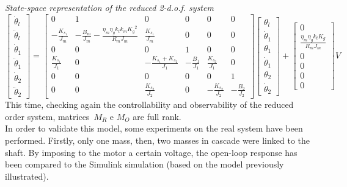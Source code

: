 \textit{State-space representation of the reduced 2-d.o.f. system}
\begin{equation}
	\begin{bmatrix}
		\dot{\theta}_l \\
		\ddot{\theta}_l \\
		\dot{\theta}_1 \\
		\ddot{\theta}_1 \\
		\dot{\theta}_2 \\
		\ddot{\theta}_2
	\end{bmatrix}
	=
	\begin{bmatrix}
		0 &1 & 0 & 0 & 0 & 0 \\
		-\frac{K_{s_1}}{J_m} & -\frac{B_m}{J_m}-\frac{\eta_m \eta_g k_t k_m {K_g}^2}{R_m J_m}  & \frac{K_{s_1}}{J_m} & 0 & 0 & 0 \\
		0 & 0 & 0 & 1 & 0 & 0 \\
		\frac{K_{s_1}}{J_1} & 0 & -\frac{K_{s_1}+K_{s_2}}{J_1} & -\frac{B_1}{J_1} & \frac{K_{s_2}}{J_1} & 0 \\
		0 & 0 & 0 & 0 & 0 & 1 \\
		0 & 0 & \frac{K_{s_2}}{J_2} & 0 & -\frac{K_{s_2}}{J_2} & -\frac{B_2}{J_2}
	\end{bmatrix}
	\begin{bmatrix}
		\theta_l \\
		\dot{\theta}_1 \\
		\theta_1 \\
		\dot{\theta}_1 \\
		\theta_2 \\
		\dot{\theta}_2
	\end{bmatrix}
	+
	\begin{bmatrix}
		0 \\
		\frac{\eta_m \eta_g k_t K_g}{R_m J_m} \\
		0 \\
		0 \\
		0 \\
		0
	\end{bmatrix}
	V
\end{equation}
This time, checking again the controllability and observability of the reduced order system, matrices~$M_R$ e $M_O$ are full rank. \\

In order to validate this model, some experiments on the real system have been performed. Firstly, only one mass, then, two masses in cascade were linked to the shaft. By imposing to the motor a certain voltage, the open-loop response has been compared to the Simulink simulation (based on the model previously illustrated).

